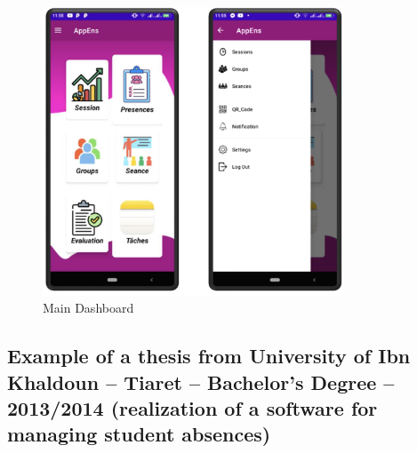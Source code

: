 \documentclass[12pt,a4paper]{report}
\begin{document}
\begin{figure}[htbp]
    \centering
    \includegraphics[width=0.8\textwidth]{images/morsli/rayane_jijel.png}
    \caption{Main Dashboard}
    \label{fig:attendance-system}
\end{figure}



\vspace{5cm}
\subsection{Example of a thesis from University of Ibn Khaldoun – Tiaret – Bachelor's Degree – 2013/2014
(realization of a software for managing student absences)}
\end{document}
